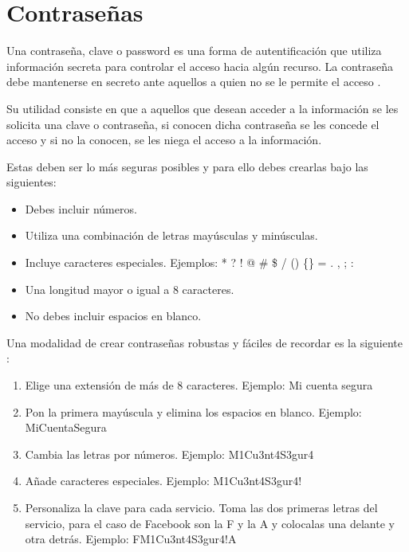 \documentclass[
  spanish,
  a4paper,
  openany]{book}
\begin{document}
\hypertarget{contraseuxf1as}{%
\section{Contraseñas}\label{contraseuxf1as}}

Una contraseña, clave o password es una forma de autentificación que utiliza información secreta para controlar el acceso hacia algún recurso. La contraseña debe mantenerse en secreto ante aquellos a quien no se le permite el acceso \citep{WIKI-password}.

Su utilidad consiste en que a aquellos que desean acceder a la información se les solicita una clave o contraseña, si conocen dicha contraseña se les concede el acceso y si no la conocen, se les niega el acceso a la información.

Estas deben ser lo más seguras posibles y para ello debes crearlas bajo las siguientes:

\begin{itemize}
\item
  Debes incluir números.
\item
  Utiliza una combinación de letras mayúsculas y minúsculas.
\item
  Incluye caracteres especiales. Ejemplos: * ? ! @ \# \$ / () \{\} = . , ; :
\item
  Una longitud mayor o igual a 8 caracteres.
\item
  No debes incluir espacios en blanco.
\end{itemize}

Una modalidad de crear contraseñas robustas y fáciles de recordar es la siguiente \citep{OSI-contraseñas}:

\begin{enumerate}
\def\labelenumi{\arabic{enumi}.}
\item
  Elige una extensión de más de 8 caracteres. Ejemplo: Mi cuenta segura
\item
  Pon la primera mayúscula y elimina los espacios en blanco. Ejemplo: MiCuentaSegura
\item
  Cambia las letras por números. Ejemplo: M1Cu3nt4S3gur4
\item
  Añade caracteres especiales. Ejemplo: M1Cu3nt4S3gur4!
\item
  Personaliza la clave para cada servicio. Toma las dos primeras letras del servicio, para el caso de Facebook son la F y la A y colocalas una delante y otra detrás. Ejemplo: FM1Cu3nt4S3gur4!A
\end{enumerate}
\end{document}
